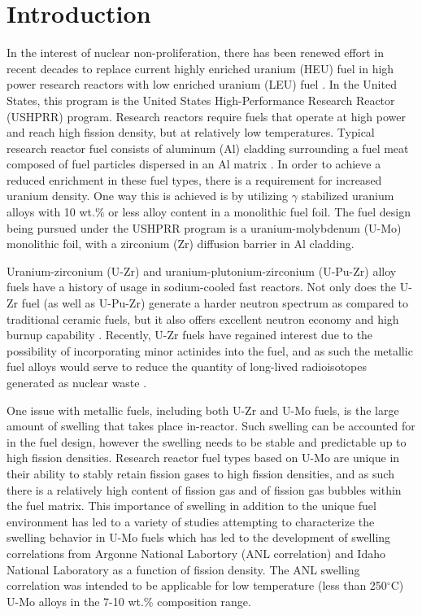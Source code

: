 \documentclass[review]{elsarticle}
\begin{document}
\section{Introduction}

In the interest of nuclear non-proliferation, there has been renewed effort in recent decades to replace current highly enriched uranium (HEU) fuel in high power research reactors with low enriched uranium (LEU) fuel \cite{snelgrove1997}. In the United States, this program is the United States High-Performance Research Reactor (USHPRR) program. Research reactors require fuels that operate at high power and reach high fission density, but at relatively low temperatures. Typical research reactor fuel consists of aluminum (Al) cladding surrounding a fuel meat composed of fuel particles dispersed in an Al matrix \cite{meyer2014}. In order to achieve a reduced enrichment in these fuel types, there is a requirement for increased uranium density. One way this is achieved is by utilizing $\gamma$ stabilized uranium alloys with 10 wt.\% or less alloy content in a monolithic fuel foil. The fuel design being pursued under the USHPRR program is a uranium-molybdenum (U-Mo) monolithic foil, with a zirconium (Zr) diffusion barrier in Al cladding. 

Uranium-zirconium (U-Zr) and uranium-plutonium-zirconium (U-Pu-Zr) alloy fuels have a history of usage in sodium-cooled fast reactors. Not only does the U-Zr fuel (as well as U-Pu-Zr) generate a harder neutron spectrum as compared to traditional ceramic fuels, but it also offers excellent neutron economy and high burnup capability \cite{hofman1997}. Recently, U-Zr fuels have regained interest due to the possibility of incorporating minor actinides into the fuel, and as such the metallic fuel alloys would serve to reduce the quantity of long-lived radioisotopes generated as nuclear waste \cite{capriotti2017}. 

One issue with metallic fuels, including both U-Zr and U-Mo fuels, is the large amount of swelling that takes place in-reactor\cite{hofman1997}. Such swelling can be accounted for in the fuel design, however the swelling needs to be stable and predictable up to high fission densities. Research reactor fuel types based on U-Mo are unique in their ability to stably retain fission gases to high fission densities, and as such there is a relatively high content of fission gas and of fission gas bubbles within the fuel matrix. This importance of swelling in addition to the unique fuel environment has led to a variety of studies attempting to characterize the swelling behavior in U-Mo fuels \cite{rest2009, kim_anl08, meyer2002, kim2013} which has led to the development of swelling correlations from Argonne National Labortory (ANL correlation) \cite{kim2011} and Idaho National Laboratory \cite{umo_prelim_report2017} as a function of fission density. The ANL swelling correlation was intended to be applicable for low temperature (less than 250$^{\circ}$C) U-Mo alloys in the 7-10 wt.\% composition range. 
\end{document}
